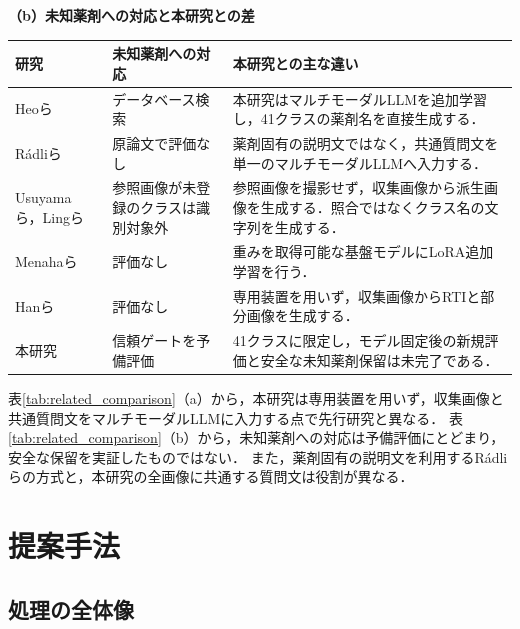 \documentclass[uplatex,dvipdfmx]{jsarticle}
\begin{document}
\begin{table}[htbp]
  \vspace{3mm}
  \textbf{（b）未知薬剤への対応と本研究との差}\\[1mm]
  \begin{tabularx}{\textwidth}{|>{\raggedright\arraybackslash}p{1.55cm}|>{\raggedright\arraybackslash}p{3.2cm}|>{\raggedright\arraybackslash}X|}
    \hline
    研究 & 未知薬剤への対応 & 本研究との主な違い \\ \hline
    Heoら\cite{heo2023pill} & データベース検索 & 本研究はマルチモーダルLLMを追加学習し，41クラスの薬剤名を直接生成する． \\ \hline
    Rádliら\cite{radli2024word,radli2024metric} & 原論文で評価なし & 薬剤固有の説明文ではなく，共通質問文を単一のマルチモーダルLLMへ入力する． \\ \hline
    Usuyamaら\cite{usuyama2020epillid}，Lingら\cite{ling2020fewshot} & 参照画像が未登録のクラスは識別対象外 & 参照画像を撮影せず，収集画像から派生画像を生成する．照合ではなくクラス名の文字列を生成する． \\ \hline
    Menahaら\cite{menaha2024gemini} & 評価なし & 重みを取得可能な基盤モデルにLoRA追加学習を行う． \\ \hline
    Hanら\cite{han2021blister} & 評価なし & 専用装置を用いず，収集画像からRTIと部分画像を生成する． \\ \hline
    本研究 & 信頼ゲートを予備評価 & 41クラスに限定し，モデル固定後の新規評価と安全な未知薬剤保留は未完了である． \\ \hline
  \end{tabularx}
\end{table}

表\ref{tab:related_comparison}（a）から，本研究は専用装置を用いず，収集画像と共通質問文をマルチモーダルLLMに入力する点で先行研究と異なる．
表\ref{tab:related_comparison}（b）から，未知薬剤への対応は予備評価にとどまり，安全な保留を実証したものではない．
また，薬剤固有の説明文を利用するRádliらの方式と，本研究の全画像に共通する質問文は役割が異なる．

\clearpage

\section{提案手法}\label{sec:method}

\subsection{処理の全体像}
\end{document}
